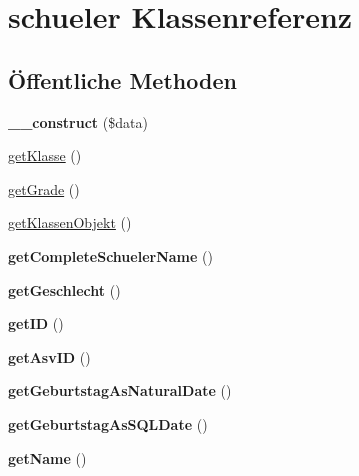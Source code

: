 \hypertarget{classschueler}{}\section{schueler Klassenreferenz}
\label{classschueler}
\subsection*{Öffentliche Methoden}
\begin{DoxyCompactItemize}
\item 
\mbox{\label{classschueler_a9a91f7dbf0fee93a6afccdf1b88fd7a0}} 
{\bfseries \+\_\+\+\_\+construct} (\$data)
\item 
\mbox{\hyperlink{classschueler_a37dd121a898655df6e7965882e6f75d7}{get\+Klasse}} ()
\item 
\mbox{\hyperlink{classschueler_aa967e04003ca82c4bca2631b2fe3c15b}{get\+Grade}} ()
\item 
\mbox{\hyperlink{classschueler_a1360a1c7bf78396acdca86108b3c73cf}{get\+Klassen\+Objekt}} ()
\item 
\mbox{\label{classschueler_ab37d5b716d512d6b5f9121921d2a75f1}} 
{\bfseries get\+Complete\+Schueler\+Name} ()
\item 
\mbox{\label{classschueler_aa62e22a85b80cf4e1136ca79c0895bbb}} 
{\bfseries get\+Geschlecht} ()
\item 
\mbox{\label{classschueler_a4564041d2536ec6a783b87a77dfdb893}} 
{\bfseries get\+ID} ()
\item 
\mbox{\label{classschueler_a3c08ae159bbdec74505b1843f5ece205}} 
{\bfseries get\+Asv\+ID} ()
\item 
\mbox{\label{classschueler_a56a29b5de315829d280d440f602c75c1}} 
{\bfseries get\+Geburtstag\+As\+Natural\+Date} ()
\item 
\mbox{\label{classschueler_aae6015e6512bc47d946cd95f58fe9207}} 
{\bfseries get\+Geburtstag\+As\+S\+Q\+L\+Date} ()
\item 
\mbox{\label{classschueler_a3c52f19dca9fe79d75d88573a51dacea}} 
{\bfseries get\+Name} ()

\end{DoxyCompactItemize}
